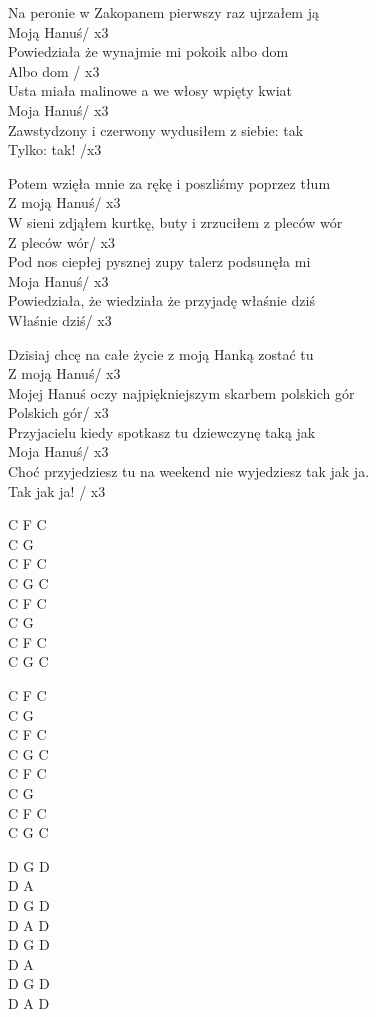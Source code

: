 \begin{text}
    Na peronie w Zakopanem pierwszy raz ujrzałem ją\\
    Moją Hanuś/ x3\\
    Powiedziała że wynajmie mi pokoik albo dom\\
    Albo dom / x3\\
    Usta miała malinowe a we włosy wpięty kwiat\\
    Moja Hanuś/ x3\\
    Zawstydzony i czerwony wydusiłem z siebie: tak\\
    Tylko: tak! /x3

    Potem wzięła mnie za rękę i poszliśmy poprzez tłum\\
    Z moją Hanuś/ x3\\
    W sieni zdjąłem kurtkę, buty i zrzuciłem z pleców wór\\
    Z pleców wór/ x3\\
    Pod nos ciepłej pysznej zupy talerz podsunęła mi\\
    Moja Hanuś/ x3\\
    Powiedziała, że wiedziała że przyjadę właśnie dziś\\
    Właśnie dziś/ x3

    Dzisiaj chcę na całe życie z moją Hanką zostać tu\\
    Z moją Hanuś/ x3\\
    Mojej Hanuś oczy najpiękniejszym skarbem polskich gór\\
    Polskich gór/ x3\\
    Przyjacielu kiedy spotkasz tu dziewczynę taką jak\\
    Moja Hanuś/ x3\\
    Choć przyjedziesz tu na weekend nie wyjedziesz tak jak ja.\\
    Tak jak ja! / x3
\end{text}
\begin{chord}
    C F C\\
    C G\\
    C F C\\
    C G C\\
    C F C\\
    C G\\
    C F C\\
    C G C

    C F C\\
    C G\\
    C F C\\
    C G C\\
    C F C\\
    C G\\
    C F C\\
    C G C

    D G D\\
    D A\\
    D G D\\
    D A D\\
    D G D\\
    D A\\
    D G D\\
    D A D
\end{chord}